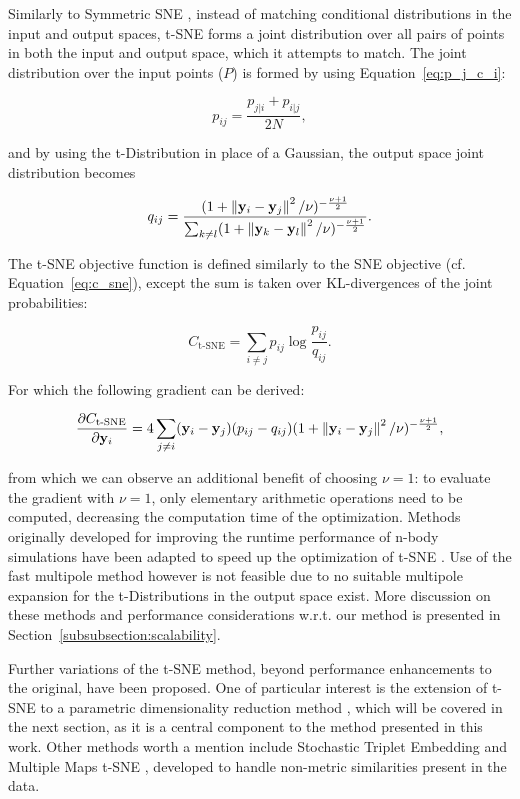 Similarly to Symmetric SNE \cite{symmetric_sne}, instead of matching conditional distributions in the input and output spaces, t-SNE forms a joint distribution over all pairs of points in both the input and output space, which it attempts to match. The joint distribution over the input points ($P$) is formed by using Equation~\ref{eq:p_j_c_i}:

$$p_{ij} = \frac{p_{j \vert i} + p_{i \vert j}}{2 N},$$

and by using the t-Distribution in place of a Gaussian, the output space joint distribution becomes

$$q_{ij} = \frac{(1 + \left\lVert\mathbf{y}_i - \mathbf{y}_j\right\rVert^2 / \nu)^{-\frac{\nu + 1}{2}}}{\sum_{k \neq l} (1 + \left\lVert\mathbf{y}_k - \mathbf{y}_l\right\rVert^2 / \nu)^{-\frac{\nu + 1}{2}}}.$$

The t-SNE objective function is defined similarly to the SNE objective (cf. Equation~\ref{eq:c_sne}), except the sum is taken over KL-divergences of the joint probabilities:

$$C_{\text{t-SNE}} = \sum_{i \neq j} p_{ij} \log \frac{p_{ij}}{q_{ij}}.$$

For which the following gradient can be derived:

\begin{equation}
\frac{\partial C_{\text{t-SNE}}}{\partial \mathbf{y}_i} = 4 \sum_{j \neq i} (\mathbf{y}_i - \mathbf{y}_j)(p_{ij} - q_{ij})(1 + \left\lVert\mathbf{y}_i - \mathbf{y}_j\right\rVert^2 / \nu)^{-\frac{\nu + 1}{2}},
\label{eq:c_tsne_grad}
\end{equation}

from which we can observe an additional benefit of choosing $\nu = 1$: to evaluate the gradient with $\nu = 1$, only elementary arithmetic operations need to be computed, decreasing the computation time of the optimization. Methods originally developed for improving the runtime performance of n-body simulations have been adapted to speed up the optimization of t-SNE \cite{accelerated_tsne_1, accelerated_tsne_2}. Use of the fast multipole method \cite{fast_multipole} however is not feasible due to no suitable multipole expansion for the t-Distributions in the output space exist. More discussion on these methods and performance considerations w.r.t. our method is presented in Section~\ref{subsubsection:scalability}.

Further variations of the t-SNE method, beyond performance enhancements to the original, have been proposed. One of particular interest is the extension of t-SNE to a parametric dimensionality reduction method \cite{parametric_tsne}, which will be covered in the next section, as it is a central component to the method presented in this work. Other methods worth a mention include Stochastic Triplet Embedding \cite{stochastic_triplet_embedding} and Multiple Maps t-SNE \cite{multiple_maps_tsne}, developed to handle non-metric similarities present in the data.

